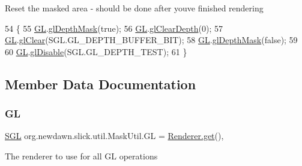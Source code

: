 Reset the masked area -\/ should be done after you\textquotesingle{}ve finished rendering 
\begin{DoxyCode}
54                                    \{
55         \mbox{\hyperlink{classorg_1_1newdawn_1_1slick_1_1util_1_1_mask_util_a0a8dc1ea7550e654529a6f92dadea889}{GL}}.\mbox{\hyperlink{interfaceorg_1_1newdawn_1_1slick_1_1opengl_1_1renderer_1_1_s_g_l_a38dbc27d7cec53cf04ff1d98fd8c15e0}{glDepthMask}}(\textcolor{keyword}{true});
56         \mbox{\hyperlink{classorg_1_1newdawn_1_1slick_1_1util_1_1_mask_util_a0a8dc1ea7550e654529a6f92dadea889}{GL}}.\mbox{\hyperlink{interfaceorg_1_1newdawn_1_1slick_1_1opengl_1_1renderer_1_1_s_g_l_ab485cf2f4c743772ed5d24a66d7c1af3}{glClearDepth}}(0);
57         \mbox{\hyperlink{classorg_1_1newdawn_1_1slick_1_1util_1_1_mask_util_a0a8dc1ea7550e654529a6f92dadea889}{GL}}.\mbox{\hyperlink{interfaceorg_1_1newdawn_1_1slick_1_1opengl_1_1renderer_1_1_s_g_l_a254bdaa78a48f3fd3fd4ada15c910d4a}{glClear}}(SGL.GL\_DEPTH\_BUFFER\_BIT);
58         \mbox{\hyperlink{classorg_1_1newdawn_1_1slick_1_1util_1_1_mask_util_a0a8dc1ea7550e654529a6f92dadea889}{GL}}.\mbox{\hyperlink{interfaceorg_1_1newdawn_1_1slick_1_1opengl_1_1renderer_1_1_s_g_l_a38dbc27d7cec53cf04ff1d98fd8c15e0}{glDepthMask}}(\textcolor{keyword}{false});
59         
60         \mbox{\hyperlink{classorg_1_1newdawn_1_1slick_1_1util_1_1_mask_util_a0a8dc1ea7550e654529a6f92dadea889}{GL}}.\mbox{\hyperlink{interfaceorg_1_1newdawn_1_1slick_1_1opengl_1_1renderer_1_1_s_g_l_a3b47b402f84bc1404e6b218264981bb5}{glDisable}}(SGL.GL\_DEPTH\_TEST);
61     \}
\end{DoxyCode}


\subsection{Member Data Documentation}
\mbox{\label{classorg_1_1newdawn_1_1slick_1_1util_1_1_mask_util_a0a8dc1ea7550e654529a6f92dadea889}} 
\subsubsection{\texorpdfstring{GL}{GL}}
{\footnotesize\ttfamily \mbox{\hyperlink{interfaceorg_1_1newdawn_1_1slick_1_1opengl_1_1renderer_1_1_s_g_l}{S\+GL}} org.\+newdawn.\+slick.\+util.\+Mask\+Util.\+GL = \mbox{\hyperlink{classorg_1_1newdawn_1_1slick_1_1opengl_1_1renderer_1_1_renderer_abe742c3a7dfca67c6c01821d27087308}{Renderer.\+get}}()\hspace{0.3cm}{\ttfamily [static]}, {\ttfamily [protected]}}

The renderer to use for all GL operations 